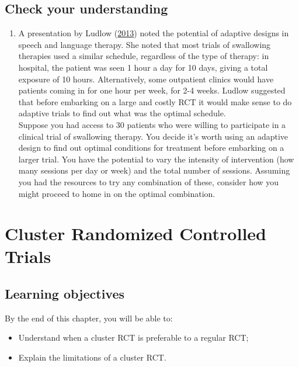 \documentclass{krantz}
\providecommand{\tightlist}{%
\setlength{\itemsep}{0pt}\setlength{\parskip}{0pt}}
\begin{document}
\hypertarget{check-your-understanding-16}{%
\section{Check your understanding}\label{check-your-understanding-16}}

\begin{enumerate}
\def\labelenumi{\arabic{enumi}.}
\tightlist
\item
  A presentation by Ludlow (\protect\hyperlink{ref-ludlow2013}{2013}) noted the potential of adaptive designs in speech and language therapy. She noted that most trials of swallowing therapies used a similar schedule, regardless of the type of therapy: in hospital, the patient was seen 1 hour a day for 10 days, giving a total exposure of 10 hours. Alternatively, some outpatient clinics would have patients coming in for one hour per week, for 2-4 weeks. Ludlow suggested that before embarking on a large and costly RCT it would make sense to do adaptive trials to find out what was the optimal schedule.\\
  Suppose you had access to 30 patients who were willing to participate in a clinical trial of swallowing therapy. You decide it's worth using an adaptive design to find out optimal conditions for treatment before embarking on a larger trial. You have the potential to vary the intensity of intervention (how many sessions per day or week) and the total number of sessions. Assuming you had the resources to try any combination of these, consider how you might proceed to home in on the optimal combination.
\end{enumerate}

\hypertarget{cluster}{%
\chapter{Cluster Randomized Controlled Trials}\label{cluster}}

\hypertarget{learning-objectives-16}{%
\section{Learning objectives}\label{learning-objectives-16}}

By the end of this chapter, you will be able to:

\begin{itemize}
\item
  Understand when a cluster RCT is preferable to a regular RCT;
\item
  Explain the limitations of a cluster RCT.
\end{itemize}
\end{document}
